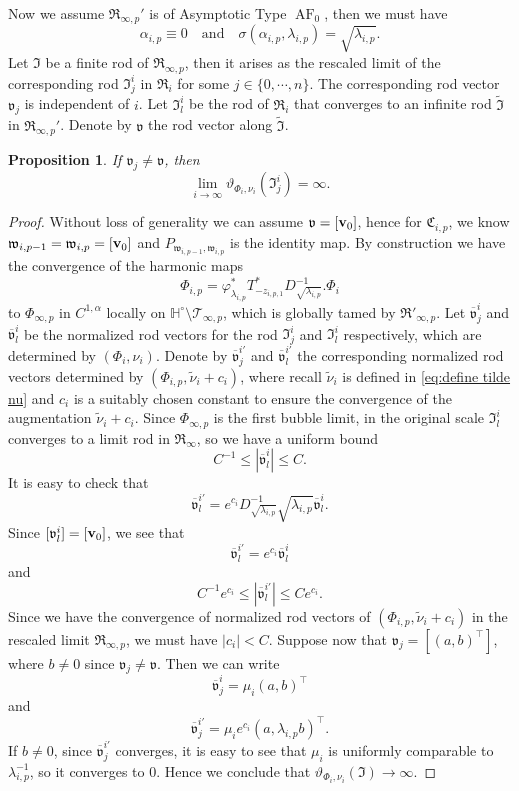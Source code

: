 \documentclass[a4paper,11pt]{amsart}
\newtheorem{proposition}[theorem]{Proposition}
\theoremstyle{definition}
\numberwithin{equation}{section}
\newcommand{\dH}{\mathbb{H}}
\newcommand{\mv} {\mathfrak v}
\newcommand{\mw} {\mathfrak w}
\newcommand{\mI} {\mathfrak I}
\newcommand{\mR} {\mathfrak R}
\newcommand{\mC} {\mathfrak C}
\DeclareMathOperator{\bv}{{\bf v}}
\DeclareMathOperator{\AF}{AF}
\begin{document}
\

Now we assume $\mR_{\infty, p}'$ is of Asymptotic Type $\AF_0$, then we must have 
$$\alpha_{i, p}\equiv0 \quad \text{and}\quad \sigma(\alpha_{i, p}, \lambda_{i, p})=\sqrt{\lambda_{i, p}}.$$   Let $\mI$ be a finite rod of $\mR_{\infty, p}$, then it arises as the rescaled limit of the  corresponding rod $\mI^i_j$ in $\mR_i$ for some $j\in \{0, \cdots, n\}$. The corresponding rod vector $\mv_j$ is independent of $i$.
Let ${\mI}^i_{l}$ be the rod  of $\mR_i$ that converges to an infinite rod $\widetilde{\mI}$ in $\mR_{\infty, p}'$. Denote by $\mv$ the rod vector along  $\widetilde{\mI}$.
\begin{proposition} \label{p:cone angle AF rod length go to zero}
	If $\mv_j\neq\mv$, then $$\lim_{i\rightarrow\infty}\vartheta_{\Phi_i, \nu_i}(\mI_j^i)=\infty.$$
\end{proposition}
\begin{proof}
Without loss of generality we can assume $\mv=[\bv_0]$, hence for $\mC_{i,p}$, we know $\mw_{i,p-1}=\mw_{i,p}=[\bv_0]$ and $P_{\mw_{i,p-1},\mw_{i,p}}$ is the identity map.
By construction we have the convergence of the harmonic maps
$$\Phi_{i, p}=\varphi_{\lambda_{i, p}}^*T_{-z_{i,p,1}}^* D_{\sqrt{\lambda_{i, p}}}^{-1}.\Phi_{i}$$   
to $\Phi_{\infty,p}$ in $C^{1, \alpha}$ locally on $\dH^\circ\setminus \mathcal T_{\infty, p}$, which is globally tamed by $\mR'_{\infty,p}$.  Let $\overline{\mv}_j^i$ and $\overline{\mv}_{l}^i$ be the normalized rod vectors for the rod $\mI_j^i$ and $\mI_{l}^i$ respectively, which are determined by $(\Phi_i, \nu_i)$. 
Denote by $\overline{\mv}_j^{i'}$ and $\overline{\mv}_{l}^{i'}$ the corresponding normalized rod vectors determined by $(\Phi_{i,p}, \widetilde{\nu}_i+c_i)$, where recall $\widetilde{\nu}_i$ is defined in \eqref{eq:define tilde nu} and $c_i$ is a suitably chosen constant to ensure the convergence of the augmentation $\tilde{\nu}_i+c_i$.
Since $\Phi_{\infty, p}$ is the first bubble limit, in the original scale ${\mI}_{l}^i$ converges to a limit rod in $\mR_\infty$, so we have a uniform bound 
$$C^{-1}\leq |\overline{\mv}_l^i|\leq C. $$
It is easy to check that $$\overline{\mv}_l^{i'}=e^{c_i}D^{-1}_{\sqrt{\lambda_{i,p}}}\sqrt{\lambda_{i,p}}\overline{\mv}_l^i.$$
Since $[{\mv}_l^i]=[\bv_0]$, we see that $$\overline{\mv}_l^{i'}=e^{c_i}\overline{\mv}_l^i$$ and
$$C^{-1} e^{c_i}\leq |\overline{\mv}_{l}^{i'}|\leq C e^{c_i}. $$
Since we have the convergence of normalized rod vectors of $(\Phi_{i,p},\widetilde{\nu}_{i}+c_i)$ in the rescaled limit $\mR_{\infty,p}$, we must have $|c_i|<C$.  Suppose now that $\mv_j=[(a, b)^\top]$, where $b\neq0$ since $\mv_j\neq\mv$. Then we can write $$\overline{\mv}_j^i=\mu_i(a, b)^\top$$ and
$$\overline{\mv}_j^{i'}=\mu_ie^{c_i} (a, \lambda_{i, p}b)^\top.$$
If $b\neq0$, since $\overline{\mv}_j^{i'}$ converges, it is easy to see that $\mu_i$ is uniformly comparable to $\lambda_{i,p}^{-1}$, so it converges to $0$. Hence we conclude that $\vartheta_{\Phi_i, \nu_i}(\mI)\rightarrow\infty$.
\end{proof}
\end{document}
